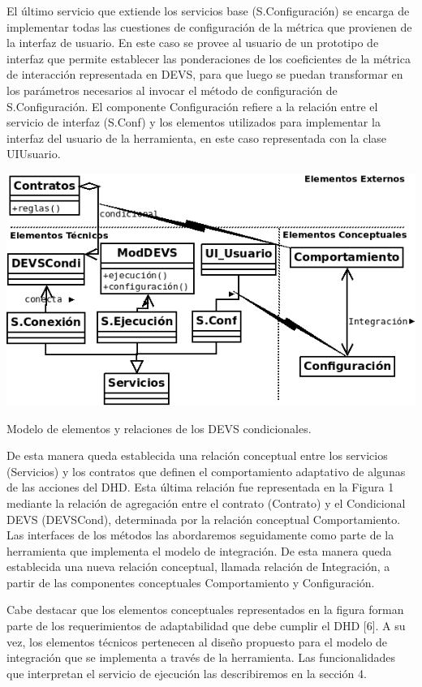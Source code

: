 El último servicio que extiende los servicios base (S.Configuración) se encarga
de implementar todas las cuestiones de configuración de la métrica que provienen
de la interfaz de usuario. En este caso se provee al usuario de un prototipo de
interfaz que permite establecer las ponderaciones de los coeficientes de la
métrica de interacción representada en DEVS, para que luego se puedan
transformar en los parámetros necesarios al invocar el método de configuración
de S.Configuración. El componente Configuración refiere a la relación entre el
servicio de interfaz (S.Conf) y los elementos utilizados para implementar la
interfaz del usuario de la herramienta, en este caso representada con la clase
UIUsuario.


\begin{center}
 \includegraphics[width=5 in,totalheight=4 in] {Ch9/f11}
\end{center}
\caption{Modelo de elementos y relaciones de los DEVS condicionales.}
                 

De esta manera queda establecida una relación conceptual entre los servicios
(Servicios) y los contratos que definen el comportamiento adaptativo de algunas
de las acciones del DHD. Esta última relación fue representada en la Figura 1
mediante la relación de agregación entre el contrato (Contrato) y el Condicional
DEVS (DEVSCond),  determinada por la relación conceptual Comportamiento. 
Las interfaces de los métodos las abordaremos seguidamente como parte de la
herramienta que implementa el modelo de integración. De esta manera queda
establecida una nueva relación conceptual, llamada relación de Integración, a
partir de las componentes conceptuales Comportamiento y Configuración.  


Cabe destacar que los elementos conceptuales representados en la figura forman
parte de los requerimientos de adaptabilidad que debe cumplir el DHD [6]. A su
vez, los elementos técnicos pertenecen al diseño propuesto para el modelo de
integración que se implementa a través de la herramienta. Las funcionalidades
que interpretan el servicio de ejecución las describiremos en la sección 4.


